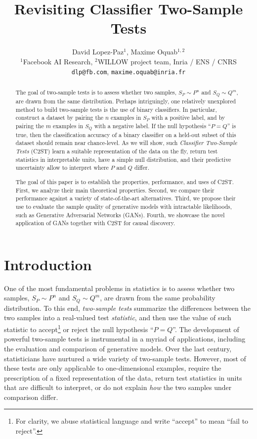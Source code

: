 \documentclass[a4paper]{article}
\title{Revisiting Classifier Two-Sample Tests}
\author{David Lopez-Paz$^1$, Maxime Oquab$^{1,2}$\\
$^1$Facebook AI Research, $^2$WILLOW project team, Inria / ENS / CNRS\\
\texttt{dlp@fb.com}, \texttt{maxime.oquab@inria.fr}
}
\begin{document}
  \maketitle

  \begin{abstract}
    The goal of two-sample tests is to assess whether two samples, $S_P \sim
    P^n$ and $S_Q \sim Q^m$, are drawn from the same distribution.  Perhaps
    intriguingly, one relatively unexplored method to build two-sample tests is
    the use of binary classifiers. In particular, construct a dataset by
    pairing the $n$ examples in $S_P$ with a positive label, and by pairing the
    $m$ examples in $S_Q$ with a negative label. If the null hypothesis ``$P =
    Q$'' is true, then the classification accuracy of a binary classifier on a
    held-out subset of this dataset should remain near chance-level.  As we
    will show, such \emph{Classifier Two-Sample Tests} (C2ST) learn a suitable
    representation of the data on the fly, return test statistics in interpretable 
    units, have a simple null distribution, and their predictive uncertainty
    allow to interpret where $P$ and $Q$ differ.

    The goal of this paper is to establish the properties, 
    performance, and uses of C2ST.  First, we analyze their main
    theoretical properties.  Second, we compare their performance against a
    variety of state-of-the-art alternatives.  Third, we propose their use to
    evaluate the sample quality of generative models with intractable
    likelihoods, such as Generative Adversarial Networks (GANs).  Fourth, we
    showcase the novel application of GANs together with C2ST for causal
    discovery.
  \end{abstract}

  \section{Introduction}
  One of the most fundamental problems in statistics is to assess whether two
  samples, $S_P \sim P^n$ and $S_Q \sim Q^m$, are drawn from the same
  probability distribution. To this end, \emph{two-sample tests}
  \citep{lehmann2006testing} summarize the differences between the two samples
  into a real-valued test \emph{statistic}, and then use the value of such
  statistic to accept\footnote{For clarity, we abuse statistical language and
  write ``accept'' to mean ``fail to reject''.} or reject the null hypothesis
  ``$P=Q$''. The development of powerful two-sample tests is instrumental in a
  myriad of applications, including the evaluation and comparison of generative
  models.  Over the last century, statisticians have nurtured a wide variety of
  two-sample tests. However, most of these tests are only applicable to
  one-dimensional examples, require the prescription of a fixed representation
  of the data, return test statistics in units that are difficult to interpret,
  or do not explain \emph{how} the two samples under comparison differ.
\end{document}
